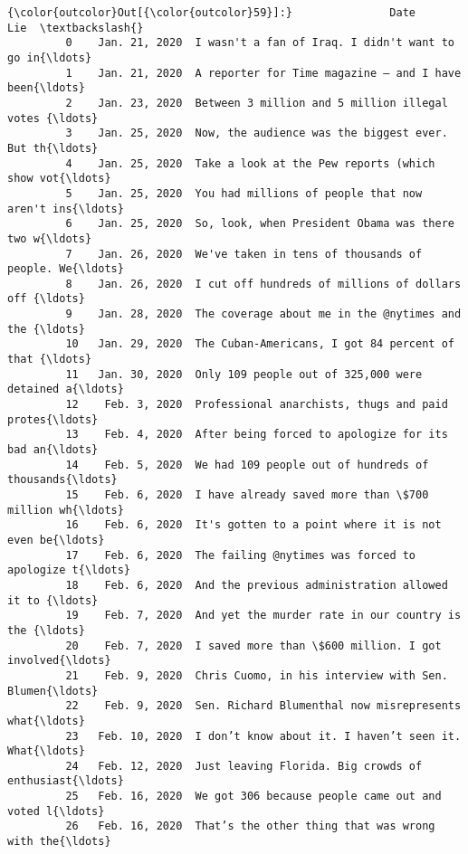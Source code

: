 \documentclass[11pt]{article}
\begin{document}
\begin{Verbatim}[commandchars=\\\{\}]
{\color{outcolor}Out[{\color{outcolor}59}]:}               Date                                                Lie  \textbackslash{}
         0    Jan. 21, 2020  I wasn't a fan of Iraq. I didn't want to go in{\ldots}   
         1    Jan. 21, 2020  A reporter for Time magazine — and I have been{\ldots}   
         2    Jan. 23, 2020  Between 3 million and 5 million illegal votes {\ldots}   
         3    Jan. 25, 2020  Now, the audience was the biggest ever. But th{\ldots}   
         4    Jan. 25, 2020  Take a look at the Pew reports (which show vot{\ldots}   
         5    Jan. 25, 2020  You had millions of people that now aren't ins{\ldots}   
         6    Jan. 25, 2020  So, look, when President Obama was there two w{\ldots}   
         7    Jan. 26, 2020  We've taken in tens of thousands of people. We{\ldots}   
         8    Jan. 26, 2020  I cut off hundreds of millions of dollars off {\ldots}   
         9    Jan. 28, 2020  The coverage about me in the @nytimes and the {\ldots}   
         10   Jan. 29, 2020  The Cuban-Americans, I got 84 percent of that {\ldots}   
         11   Jan. 30, 2020  Only 109 people out of 325,000 were detained a{\ldots}   
         12    Feb. 3, 2020  Professional anarchists, thugs and paid protes{\ldots}   
         13    Feb. 4, 2020  After being forced to apologize for its bad an{\ldots}   
         14    Feb. 5, 2020  We had 109 people out of hundreds of thousands{\ldots}   
         15    Feb. 6, 2020  I have already saved more than \$700 million wh{\ldots}   
         16    Feb. 6, 2020  It's gotten to a point where it is not even be{\ldots}   
         17    Feb. 6, 2020  The failing @nytimes was forced to apologize t{\ldots}   
         18    Feb. 6, 2020  And the previous administration allowed it to {\ldots}   
         19    Feb. 7, 2020  And yet the murder rate in our country is the {\ldots}   
         20    Feb. 7, 2020  I saved more than \$600 million. I got involved{\ldots}   
         21    Feb. 9, 2020  Chris Cuomo, in his interview with Sen. Blumen{\ldots}   
         22    Feb. 9, 2020  Sen. Richard Blumenthal now misrepresents what{\ldots}   
         23   Feb. 10, 2020  I don’t know about it. I haven’t seen it. What{\ldots}   
         24   Feb. 12, 2020  Just leaving Florida. Big crowds of enthusiast{\ldots}   
         25   Feb. 16, 2020  We got 306 because people came out and voted l{\ldots}   
         26   Feb. 16, 2020  That’s the other thing that was wrong with the{\ldots}   

\end{Verbatim}
\end{document}
